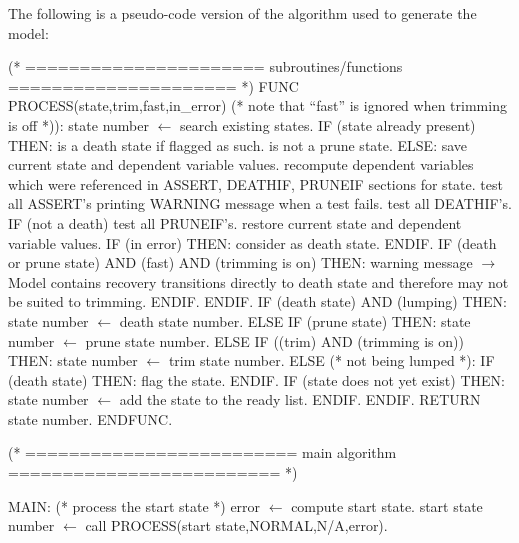 The following is a pseudo-code version of the algorithm used to generate
the model:
\begin{logfileexample}
(* ====================== subroutines/functions ===================== *)
FUNC  PROCESS(state,trim,fast,in\_error)
      (* note that ``fast'' is ignored when trimming is off *)):
      state number \(\longleftarrow\) search existing states.
      IF (state already present) THEN:
         is a death state if flagged as such.
         is not a prune state.
      ELSE:
         save current state and dependent variable values.
            recompute dependent variables which were referenced in
                 ASSERT, DEATHIF, PRUNEIF sections for state.
            test all ASSERT's printing WARNING message when a test fails.
            test all DEATHIF's.
            IF (not a death) test all PRUNEIF's.
         restore current state and dependent variable values.
         IF (in error) THEN:
            consider as death state.
         ENDIF.
         IF (death or prune state) AND (fast) AND (trimming is on) THEN:
            warning message \(\longrightarrow\)
                 Model contains recovery transitions directly to death state
                 and therefore may not be suited to trimming.
         ENDIF.
      ENDIF.
      IF (death state) AND (lumping) THEN:
         state number \(\longleftarrow\) death state number.
      ELSE IF (prune state) THEN:
         state number \(\longleftarrow\) prune state number.
      ELSE IF ((trim) AND (trimming is on)) THEN:
         state number \(\longleftarrow\) trim state number.
      ELSE (* not being lumped *):
         IF (death state) THEN:
            flag the state.
         ENDIF.
         IF (state does not yet exist) THEN:
            state number \(\longleftarrow\) add the state to the ready list.
         ENDIF.
      ENDIF.
      RETURN state number.
ENDFUNC.

(* ========================= main algorithm ========================= *)

MAIN:
    (* process the start state *)
    error \(\longleftarrow\) compute start state.
    start state number \(\longleftarrow\) call PROCESS(start state,NORMAL,N/A,error).


\end{logfileexample}
